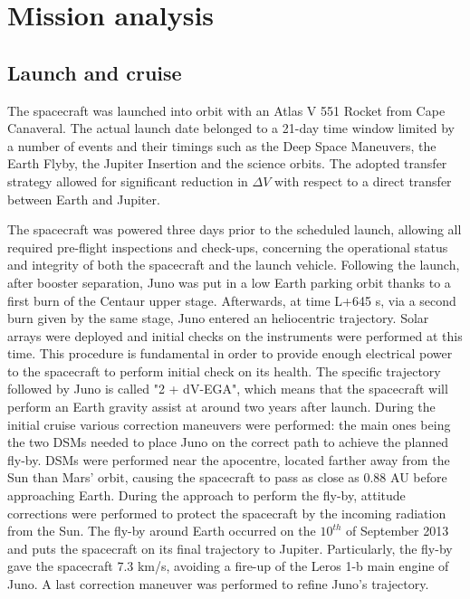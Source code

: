 \section{Mission analysis}
\label{sec:mission_analysis}

\subsection{Launch and cruise}
\label{sec: lancio e crociera}

The spacecraft was launched into orbit with an Atlas V 551 Rocket from Cape Canaveral. The actual launch date belonged to a 21-day time window limited by a number of events and their timings such as the Deep Space Maneuvers, the Earth Flyby, the Jupiter Insertion and the science orbits. The adopted transfer strategy allowed for significant reduction in $\Delta V$ with respect to a direct transfer between Earth and Jupiter.

The spacecraft was powered three days prior to the scheduled launch, allowing all required pre-flight inspections and check-ups, concerning the operational status and integrity of both the spacecraft and the launch vehicle.%
Following the launch, after booster separation, Juno was put in a low Earth parking orbit thanks to a first burn of the Centaur upper stage. Afterwards, at time L+645 s, via a second burn given by the same stage, Juno entered an heliocentric trajectory. Solar arrays were deployed and initial checks on the instruments were performed at this time. This procedure is fundamental in order to provide enough electrical power to the spacecraft to perform initial check on its health. 
The specific trajectory followed by Juno is called "2 + dV-EGA", which means that the spacecraft will perform an Earth gravity assist at around two years after launch.
During the initial cruise various correction maneuvers were performed: the main ones being the two DSMs needed to place Juno on the correct path to achieve the planned fly-by. 
DSMs were performed near the apocentre, located farther away from the Sun than Mars' orbit, causing the spacecraft to pass as close as 0.88 AU before approaching Earth.  During the approach to perform the fly-by, attitude corrections were performed to protect the spacecraft by the incoming radiation from the Sun. 
The fly-by around Earth occurred on the $10^{th}$ of September 2013 and puts the spacecraft on its final trajectory to Jupiter. Particularly, the fly-by gave the spacecraft 7.3 km/s, avoiding a fire-up of the Leros 1-b main engine of Juno. A last correction maneuver was performed to refine Juno's trajectory. \cite{Overview_Juno} \cite{Juno_launch} \cite{batterie} \cite{spaceflight101} \cite{NASA_horizons}

